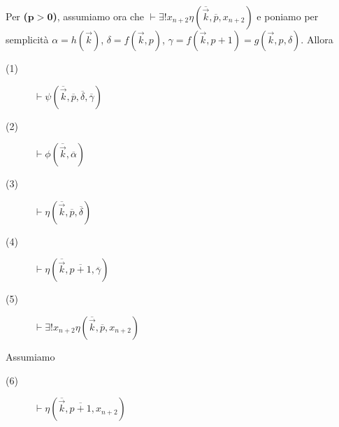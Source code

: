 \begin{itemize}
\begin{enumerate}
     Per \textbf{($\mathbf{p>0}$)}, assumiamo ora che $\vdash \exists!x_{n+2} \eta(\overline{\vec{k}},\overline{p},x_{n+2})$ e poniamo per semplicit\`a $\alpha=h(\vec{k})$, $\delta=f(\vec{k},p)$, $\gamma=f(\vec{k},p+1)=g(\vec{k},p,\delta)$. Allora
        \begin{description}
          \item[(1)] $\vdash \psi(\overline{\vec{k}},\overline{p},\overline{\delta},\overline{\gamma})$
          \item[(2)] $\vdash \phi(\overline{\vec{k}},\overline{\alpha})$
          \item[(3)] $\vdash \eta(\overline{\vec{k}},\overline{p},\overline{\delta})$
          \item[(4)] $\vdash \eta(\overline{\vec{k}},\overline{p+1},\overline{\gamma})$
          \item[(5)] $\vdash \exists!x_{n+2} \eta(\overline{\vec{k}},\overline{p},x_{n+2})$ \\
        \end{description}
        Assumiamo
        \begin{description}
        \item[(6)] $\vdash \eta(\overline{\vec{k}},\overline{p+1},x_{n+2})$ \\
        \end{description}


\end{enumerate}
\end{itemize}
